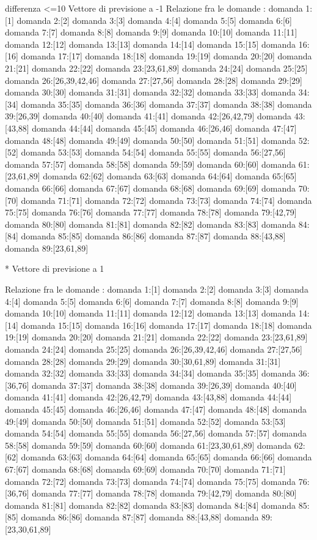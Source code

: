 differenza <=10
 Vettore di previsione a -1
Relazione fra le domande :
domanda 1:[1]
domanda 2:[2]
domanda 3:[3]
domanda 4:[4]
domanda 5:[5]
domanda 6:[6]
domanda 7:[7]
domanda 8:[8]
domanda 9:[9]
domanda 10:[10]
domanda 11:[11]
domanda 12:[12]
domanda 13:[13]
domanda 14:[14]
domanda 15:[15]
domanda 16:[16]
domanda 17:[17]
domanda 18:[18]
domanda 19:[19]
domanda 20:[20]
domanda 21:[21]
domanda 22:[22]
domanda 23:[23,61,89]
domanda 24:[24]
domanda 25:[25]
domanda 26:[26,39,42,46]
domanda 27:[27,56]
domanda 28:[28]
domanda 29:[29]
domanda 30:[30]
domanda 31:[31]
domanda 32:[32]
domanda 33:[33]
domanda 34:[34]
domanda 35:[35]
domanda 36:[36]
domanda 37:[37]
domanda 38:[38]
domanda 39:[26,39]
domanda 40:[40]
domanda 41:[41]
domanda 42:[26,42,79]
domanda 43:[43,88]
domanda 44:[44]
domanda 45:[45]
domanda 46:[26,46]
domanda 47:[47]
domanda 48:[48]
domanda 49:[49]
domanda 50:[50]
domanda 51:[51]
domanda 52:[52]
domanda 53:[53]
domanda 54:[54]
domanda 55:[55]
domanda 56:[27,56]
domanda 57:[57]
domanda 58:[58]
domanda 59:[59]
domanda 60:[60]
domanda 61:[23,61,89]
domanda 62:[62]
domanda 63:[63]
domanda 64:[64]
domanda 65:[65]
domanda 66:[66]
domanda 67:[67]
domanda 68:[68]
domanda 69:[69]
domanda 70:[70]
domanda 71:[71]
domanda 72:[72]
domanda 73:[73]
domanda 74:[74]
domanda 75:[75]
domanda 76:[76]
domanda 77:[77]
domanda 78:[78]
domanda 79:[42,79]
domanda 80:[80]
domanda 81:[81]
domanda 82:[82]
domanda 83:[83]
domanda 84:[84]
domanda 85:[85]
domanda 86:[86]
domanda 87:[87]
domanda 88:[43,88]
domanda 89:[23,61,89]

* Vettore di previsione a 1

Relazione fra le domande :
domanda 1:[1]
domanda 2:[2]
domanda 3:[3]
domanda 4:[4]
domanda 5:[5]
domanda 6:[6]
domanda 7:[7]
domanda 8:[8]
domanda 9:[9]
domanda 10:[10]
domanda 11:[11]
domanda 12:[12]
domanda 13:[13]
domanda 14:[14]
domanda 15:[15]
domanda 16:[16]
domanda 17:[17]
domanda 18:[18]
domanda 19:[19]
domanda 20:[20]
domanda 21:[21]
domanda 22:[22]
domanda 23:[23,61,89]
domanda 24:[24]
domanda 25:[25]
domanda 26:[26,39,42,46]
domanda 27:[27,56]
domanda 28:[28]
domanda 29:[29]
domanda 30:[30,61,89]
domanda 31:[31]
domanda 32:[32]
domanda 33:[33]
domanda 34:[34]
domanda 35:[35]
domanda 36:[36,76]
domanda 37:[37]
domanda 38:[38]
domanda 39:[26,39]
domanda 40:[40]
domanda 41:[41]
domanda 42:[26,42,79]
domanda 43:[43,88]
domanda 44:[44]
domanda 45:[45]
domanda 46:[26,46]
domanda 47:[47]
domanda 48:[48]
domanda 49:[49]
domanda 50:[50]
domanda 51:[51]
domanda 52:[52]
domanda 53:[53]
domanda 54:[54]
domanda 55:[55]
domanda 56:[27,56]
domanda 57:[57]
domanda 58:[58]
domanda 59:[59]
domanda 60:[60]
domanda 61:[23,30,61,89]
domanda 62:[62]
domanda 63:[63]
domanda 64:[64]
domanda 65:[65]
domanda 66:[66]
domanda 67:[67]
domanda 68:[68]
domanda 69:[69]
domanda 70:[70]
domanda 71:[71]
domanda 72:[72]
domanda 73:[73]
domanda 74:[74]
domanda 75:[75]
domanda 76:[36,76]
domanda 77:[77]
domanda 78:[78]
domanda 79:[42,79]
domanda 80:[80]
domanda 81:[81]
domanda 82:[82]
domanda 83:[83]
domanda 84:[84]
domanda 85:[85]
domanda 86:[86]
domanda 87:[87]
domanda 88:[43,88]
domanda 89:[23,30,61,89]

